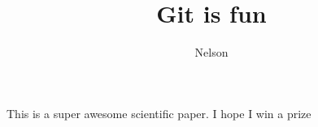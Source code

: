 \documentclass[10pt]{article}
\author{Nelson}
\title{Git is fun}
\begin{document}
		\maketittle
		
		This is a super awesome scientific paper.
		I hope I win a prize
		
\end{document}
